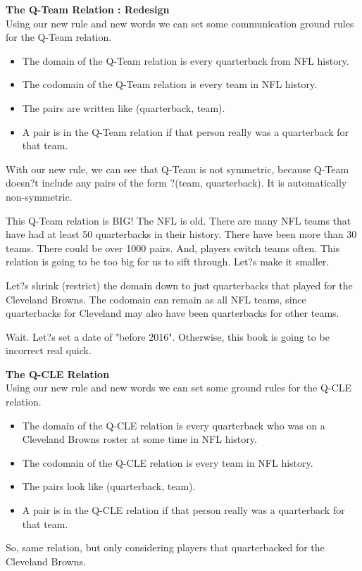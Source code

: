 \documentclass{ximera}
\begin{document}
\textbf{The Q-Team Relation : Redesign} \\
Using our new rule and new words we can set some communication ground rules for the Q-Team relation.


\begin{itemize}
 \item The domain of the Q-Team relation is every quarterback  from NFL history.
 \item The codomain of the Q-Team relation is every team in NFL history.
 \item The pairs are written like (quarterback, team).  
 \item  A pair is in the Q-Team relation if that person really was a quarterback for that team.
 \end{itemize}



With our new rule, we can see that Q-Team is not symmetric, because Q-Team doesn?t include any pairs of the form ?(team, quarterback). It is automatically non-symmetric.

This Q-Team relation is BIG! The NFL is old. There are many NFL teams that have had at least 50 quarterbacks in their history.  There have been more than 30 teams.  There could be over 1000 pairs.  And, players switch teams often.  This relation is going to be too big for us to sift through.  Let?s make it smaller.

Let?s shrink (restrict) the domain down to just quarterbacks that played for the Cleveland Browns. The codomain can remain as all NFL teams, since quarterbacks for Cleveland may also have been quarterbacks for other teams.

Wait. Let?s set a date of "before 2016". Otherwise, this book is going to be incorrect real quick.



\textbf{The Q-CLE Relation} \\
Using our new rule and new words we can set some ground rules for the Q-CLE relation.
\begin{itemize}
\item The domain of the Q-CLE relation is every quarterback who was on a Cleveland Browns roster at some time in NFL history.
\item The codomain of the Q-CLE relation is every team in NFL history.
\item The pairs look like (quarterback, team).  
\item A pair is in the Q-CLE relation if that person really was a quarterback for that team.
\end{itemize}
So, same relation, but only considering players that quarterbacked for the Cleveland Browns.
\end{document}

